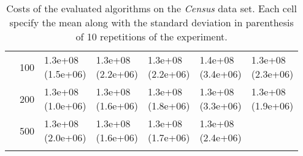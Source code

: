 \begin{longtable}{lllllll}
   & 100 &  \parbox[t]{17mm}{1.3e+08\\\small(1.5e+06)} &  \parbox[t]{17mm}{1.3e+08\\\small(2.2e+06)} &  \parbox[t]{17mm}{1.3e+08\\\small(2.2e+06)} &  \parbox[t]{17mm}{1.4e+08\\\small(3.4e+06)} &  \parbox[t]{17mm}{1.3e+08\\\small(2.3e+06)} \\
   & 200 &  \parbox[t]{17mm}{1.3e+08\\\small(1.0e+06)} &  \parbox[t]{17mm}{1.3e+08\\\small(1.6e+06)} &  \parbox[t]{17mm}{1.3e+08\\\small(1.8e+06)} &  \parbox[t]{17mm}{1.3e+08\\\small(3.3e+06)} &  \parbox[t]{17mm}{1.3e+08\\\small(1.9e+06)} \\
   & 500 &  \parbox[t]{17mm}{1.3e+08\\\small(2.0e+06)} &  \parbox[t]{17mm}{1.3e+08\\\small(1.6e+06)} &  \parbox[t]{17mm}{1.3e+08\\\small(1.7e+06)} &  \parbox[t]{17mm}{1.3e+08\\\small(2.4e+06)} &                 \\
\bottomrule
\caption{Costs of the evaluated algorithms on the \textit{Census} data set. Each cell specify the mean along with the standard deviation in parenthesis of 10 repetitions of the experiment.}
\label{tab:real-cost-mean-std-census}
\end{longtable}

